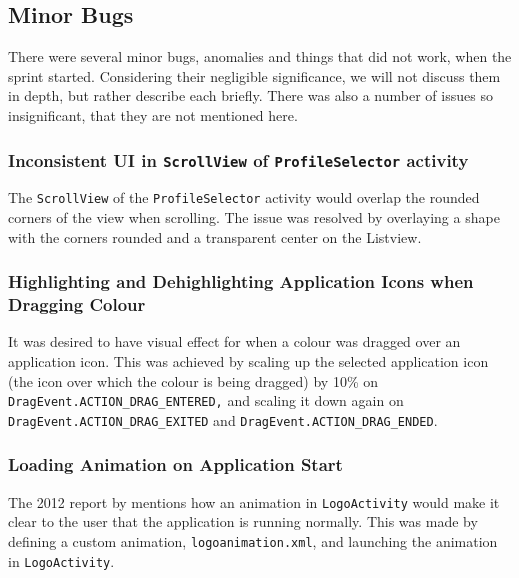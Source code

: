 \subsection{Minor Bugs}

There were several minor bugs, anomalies and things that did not work, when the sprint started.
Considering their negligible significance, we will not discuss them in depth, but rather describe each briefly.
There was also a number of issues so insignificant, that they are not mentioned here.

\subsubsection{Inconsistent UI in \lstinline{ScrollView} of \lstinline{ProfileSelector} activity}
The \lstinline{ScrollView} of the \lstinline{ProfileSelector} activity would overlap the rounded corners of the view when scrolling.
The issue was resolved by overlaying a shape with the corners rounded and a transparent center on the Listview.

\subsubsection{Highlighting and Dehighlighting Application Icons when Dragging Colour}
It was desired to have visual effect for when a colour was dragged over an application icon.
This was achieved by scaling up the selected application icon (the icon over which the colour is being dragged) by 10\% on \lstinline{DragEvent.ACTION_DRAG_ENTERED,} and scaling it down again on \lstinline{DragEvent.ACTION_DRAG_EXITED} and \lstinline{DragEvent.ACTION_DRAG_ENDED}.

\subsubsection{Loading Animation on Application Start}
The 2012 report by \citet{launcher2012} mentions how an animation in \lstinline{LogoActivity} would make it clear to the user that the application is running normally.
This was made by defining a custom animation, \lstinline{logoanimation.xml}, and launching the animation in \lstinline{LogoActivity}.

